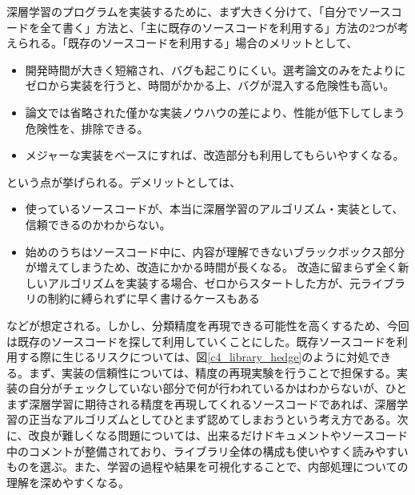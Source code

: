 深層学習のプログラムを実装するために、まず大きく分けて、「自分でソースコードを全て書く」方法と、「主に既存のソースコードを利用する」方法の2つが考えられる。「既存のソースコードを利用する」場合のメリットとして、
\begin{itemize}
\item 開発時間が大きく短縮され、バグも起こりにくい。選考論文のみをたよりにゼロから実装を行うと、時間がかかる上、バグが混入する危険性も高い。
\item 論文では省略された僅かな実装ノウハウの差により、性能が低下してしまう危険性を、排除できる。
\item メジャーな実装をベースにすれば、改造部分も利用してもらいやすくなる。
\end{itemize}
という点が挙げられる。デメリットとしては、
\begin{itemize}
\item 使っているソースコードが、本当に深層学習のアルゴリズム・実装として、信頼できるのかわからない。
\item 始めのうちはソースコード中に、内容が理解できないブラックボックス部分が増えてしまうため、改造にかかる時間が長くなる。 改造に留まらず全く新しいアルゴリズムを実装する場合、ゼロからスタートした方が、元ライブラリの制約に縛られずに早く書けるケースもある
\end{itemize}
などが想定される。しかし、分類精度を再現できる可能性を高くするため、今回は既存のソースコードを探して利用していくことにした。既存ソースコードを利用する際に生じるリスクについては、図\ref{c4_library_hedge}のように対処できる。まず、実装の信頼性については、精度の再現実験を行うことで担保する。実装の自分がチェックしていない部分で何が行われているかはわからないが、ひとまず深層学習に期待される精度を再現してくれるソースコードであれば、深層学習の正当なアルゴリズムとしてひとまず認めてしまおうという考え方である。次に、改良が難しくなる問題については、出来るだけドキュメントやソースコード中のコメントが整備されており、ライブラリ全体の構成も使いやすく読みやすいものを選ぶ。また、学習の過程や結果を可視化することで、内部処理についての理解を深めやすくなる。\par


